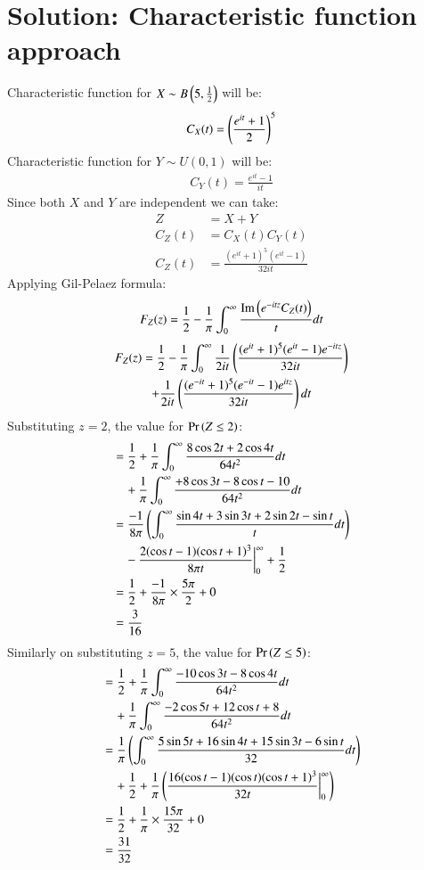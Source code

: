 \documentclass[journal,12pt,twocolumn]{IEEEtran}
\begin{document}
\section*{Solution: Characteristic function approach}
Characteristic function for $X \sim B\left(5,\frac{1}{2}\right)$ will be:
\begin{align}
    C_X(t)=\left(\frac{e^{it}+1}{2}\right)^5
\end{align}
Characteristic function for $Y \sim U(0,1)$ will be:
\begin{align}
    C_Y(t)=\frac{e^{it}-1}{it}
\end{align}
Since both $X$ and $Y$ are independent we can take:
\begin{align}
    Z&=X+Y\\
    C_Z(t)&=C_X(t)C_Y(t)\\
    C_Z(t)&= \frac{(e^{it}+1)^5(e^{it}-1)}{32it}
\end{align}
Applying Gil-Pelaez formula:
\begin{align}
    F_Z(z)=\frac{1}{2}-\frac{1}{\pi}\int_0^\infty \frac{\text{Im}\left(e^{-itz}C_Z(t)\right)}{t}dt
\end{align}
\begin{multline*}
    F_Z(z)=\frac{1}{2}-\frac{1}{\pi}\int_0^\infty\frac{1}{2it}\left(\frac{(e^{it}+1)^5(e^{it}-1)e^{-itz}}{32it}\right)\\+\frac{1}{2it}\left(\frac{(e^{-it}+1)^5(e^{-it}-1)e^{itz}}{32it}\right)dt
\end{multline*}
Substituting $z=2$, the value for $\Pr\left(Z\leq 2\right)$:
\begin{align}
\nonumber
    &=\frac{1}{2}+\frac{1}{\pi}\int_0^\infty \frac{8\cos{2t}+2\cos{4t}}{64t^2}dt\\
    &\quad+\frac{1}{\pi}\int_0^\infty\frac{+8\cos{3t}-8\cos{t}-10}{64t^2}dt\\ \nonumber
    &=\frac{-1}{8\pi}\left(\int_0^\infty\frac{\sin{4t}+3\sin{3t}+2\sin{2t}-\sin{t}}{t}dt\right)\\
    &\quad -\frac{2(\cos{t}-1)(\cos{t}+1)^3}{8\pi t}\bigg|_0^\infty+\frac{1}{2}\\
    &=\frac{1}{2} + \frac{-1}{8\pi}\times \frac{5\pi}{2}+0\\
    &=\frac{3}{16}\label{first_value}
\end{align}
Similarly on substituting $z=5$, the value for $\Pr\left(Z\leq 5\right)$:
\begin{align}
\nonumber
    &=\frac{1}{2} +\frac{1}{\pi}\int_0^\infty\frac{-10\cos{3t}-8\cos{4t}}{64t^2}dt\\&\quad +\frac{1}{\pi}\int_0^\infty\frac{-2\cos{5t}+12\cos{t}+8}{64t^2}dt\\ \nonumber
    &=\frac{1}{\pi}\left(\int_0^\infty\frac{5\sin{5t}+16\sin{4t}+15\sin{3t}-6\sin{t}}{32}dt\right)\\
    &\quad+\frac{1}{2}+\frac{1}{\pi}\left(\frac{16(\cos{t}-1)(\cos{t})(\cos{t}+1)^3}{32t}\bigg|_0^\infty\right)\\
    &=\frac{1}{2}+\frac{1}{\pi}\times\frac{15\pi}{32} + 0\\
    &=\frac{31}{32}
\end{align}
\end{document}
